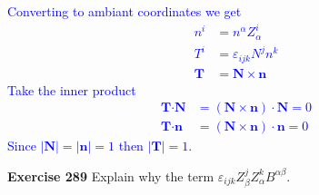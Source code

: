\documentclass[12pt,a4paper]{report}
\newcommand{\BLUE}[1]{\textcolor{blue}{#1}}
\begin{document}
\begin{description}
\BLUE{Converting to ambiant coordinates we get
\begin{align*}
	n^i &= n^\alpha Z^i_\alpha \\
	T^i &= \varepsilon_{ijk}N^jn^k \\
	\textbf{T} &= \textbf{N}\times\textbf{n}
\end{align*}Take the inner product
\begin{align*}
	\textbf{T}\cdot\textbf{N} &= (\textbf{N}\times\textbf{n})\cdot\textbf{N} = 0\\
	\textbf{T}\cdot\textbf{n} &= (\textbf{N}\times\textbf{n})\cdot\textbf{n} = 0
\end{align*}Since $|\textbf{N}| = |\textbf{n}| = 1$ then $|\textbf{T}|=1$.
}

\item \textbf{Exercise 289} Explain why the term $\varepsilon_{ijk}Z^j_\beta Z^k_\alpha B^{\alpha\beta}$.

\end{description}
\end{document}
